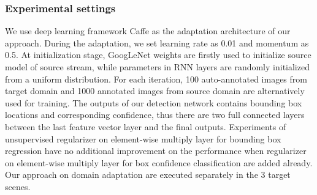 \documentclass[runningheads]{llncs}
\begin{document}
\subsubsection{Experimental settings}
We use deep learning framework Caffe \cite{jia2014caffe} as the adaptation architecture of our approach. During the adaptation, we set learning rate as 0.01 and momentum as 0.5. At initialization stage, GoogLeNet weights are firstly used to initialize source model of source stream, while parameters in RNN layers are randomly initialized from a uniform distribution. For each iteration, 100 auto-annotated images from target domain and 1000 annotated images from source domain are alternatively used for training. The outputs of our detection network contains bounding box locations and corresponding confidence, thus there are two full connected layers between the last feature vector layer and the final outputs. Experiments of unsupervised regularizer on element-wise multiply layer for bounding box regression have no additional improvement on the performance when regularizer on element-wise multiply layer for box confidence classification are added already. Our approach on domain adaptation are executed separately in the 3 target scenes.
\end{document}
